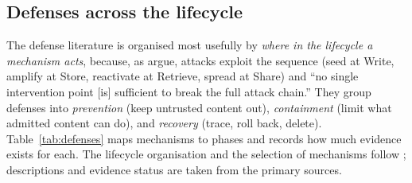 \documentclass[11pt]{article}
\begin{document}
\subsection{Defenses across the lifecycle}
\label{sec:defenses}

The defense literature is organised most usefully by \emph{where in the lifecycle a mechanism acts}, because, as \citet{lin2026security} argue, attacks exploit the sequence (seed at Write, amplify at Store, reactivate at Retrieve, spread at Share) and ``no single intervention point [is] sufficient to break the full attack chain.'' They group defenses into \emph{prevention} (keep untrusted content out), \emph{containment} (limit what admitted content can do), and \emph{recovery} (trace, roll back, delete). Table~\ref{tab:defenses} maps mechanisms to phases and records how much evidence exists for each. The lifecycle organisation and the selection of mechanisms follow \citet{lin2026security}; descriptions and evidence status are taken from the primary sources.
\end{document}
